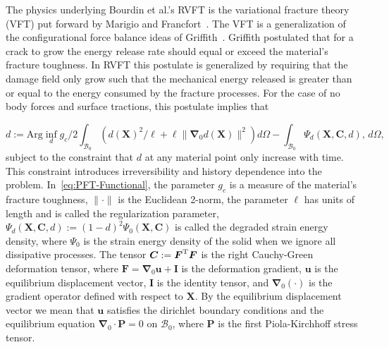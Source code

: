 \documentclass[10pt,letterpaper]{article}
\newcommand{\bs}[1]{\ensuremath{\boldsymbol{#1}}}
\begin{document}
The physics underlying Bourdin et al.'s RVFT is  the variational fracture theory (VFT) put forward by Marigio and Francfort~\cite{francfort_1998}. The VFT is a generalization of the configurational force balance ideas of  Griffith~\cite{griffith1921phenomena}. Griffith postulated that for a crack to grow the energy release rate should equal or exceed the material's fracture toughness.  In RVFT this postulate is generalized by requiring that the  damage  field only grow  such that the  mechanical energy released is   greater than or equal to the  energy consumed by the fracture processes.  For the case of no   body forces and surface tractions, this postulate implies that

\begin{equation}
\label{eq:PFT-Functional}
d:=\text{Arg}\inf_d
g_c/2
\int_{\mathcal{B}_0}
\left(
d(\bs{X})^2/\ell + \ell \lVert\bs{\nabla}_0d(\bs{X})\rVert^2
\right)
d\Omega
-\int_{\mathcal{B}_0}
\Psi_{d}(\mathbf{X},\bs{C}, d),
\, d\Omega,
\end{equation}
%
subject to the constraint that $d$ at any material point only  increase with time. This constraint introduces irreversibility and history dependence into the problem. In~\eqref{eq:PFT-Functional}, the parameter $g_c$ is a measure of the  material's fracture toughness,  $\|\cdot\|$ is the Euclidean 2-norm, the parameter $\ell$ has units of length and is called the regularization parameter, $\Psi_{d}(\mathbf{X},\bs{C}, d):=(1-d)^2 \Psi_{0}(\bs{X}, \bs{C})$ is called the degraded strain energy density,  where  $\Psi_0$ is the strain energy density of the solid when we ignore all dissipative processes.  The tensor $\bs{C}:=\bs{F}^{\rm T}\bs{F}$ is the right Cauchy-Green deformation tensor, where $\bs{F}=\bs{\nabla}_{0}\bs{u}+\bs{I}$ is the deformation gradient, $\bs{u}$ is the equilibrium displacement vector, $\bs{I}$ is the identity tensor, and $\bs{\nabla}_0(\cdot)$ is the gradient operator defined with respect to $\bs{X}$.  By the  equilibrium displacement vector we mean that $\bs{u}$ satisfies the dirichlet boundary conditions and the equilibrium equation $\bs{\nabla}_0\cdot\bs{P}=0$ on $\mathcal{B}_0$, where $\bs{P}$ is the first Piola-Kirchhoff stress tensor.%
\end{document}
